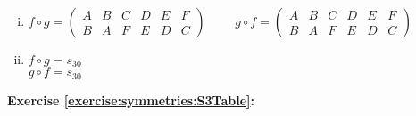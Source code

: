 \begin{enumerate}[(a)]
\begin{enumerate}[(i)]
	\item
	$f\circ g=\begin{pmatrix}
	A & B & C & D & E & F\\
	B & A & F & E & D & C
	\end{pmatrix}$
	$\qquad g\circ f=\begin{pmatrix}
	A & B & C & D & E & F\\
	B & A & F & E & D & C
	\end{pmatrix}$
	
	\item
	$f\circ g = s_{30}$\\
	$g\circ f = s_{30}$
	\end{enumerate}
\end{enumerate}

\noindent\textbf{Exercise \ref{exercise:symmetries:S3Table}:}
